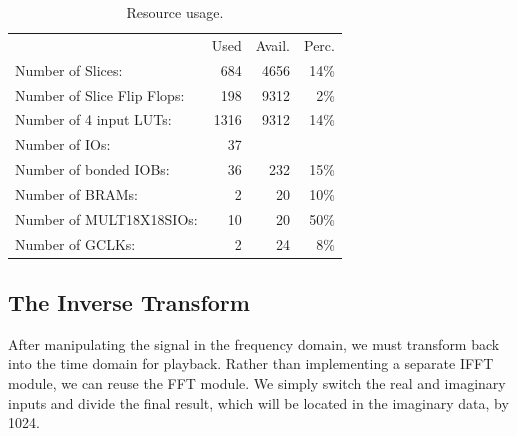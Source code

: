 \documentclass[twoside]{article}
\begin{document}
  \begin{table}[h]
  \begin{tabular}{l  r  r  r}
                                        & Used  & Avail. & Perc. \\
   Number of Slices:                    &  684  & 4656  &  14\%  \\
   Number of Slice Flip Flops:          &  198  & 9312  &   2\%  \\
   Number of 4 input LUTs:              & 1316  & 9312  &  14\%  \\
   Number of IOs:                       &   37  &       &      \\
   Number of bonded IOBs:               &   36  &  232  &  15\%  \\
   Number of BRAMs:                     &    2  &   20  &  10\%  \\
   Number of MULT18X18SIOs:             &   10  &   20  &  50\%  \\
   Number of GCLKs:                     &    2  &   24  &   8\%  \\
 \end{tabular}
 \caption{Resource usage.}
 \label{tab:usage}
 \end{table}
  
  
  
  \subsection{The Inverse Transform}
    After manipulating the signal in the frequency domain, we must transform back into the time domain for playback. 
    Rather than implementing a separate IFFT module, we can reuse the FFT module.  We simply switch the real and imaginary
    inputs and divide the final result, which will be located in the imaginary data, by 1024.

%
%
%
%
\end{document}
